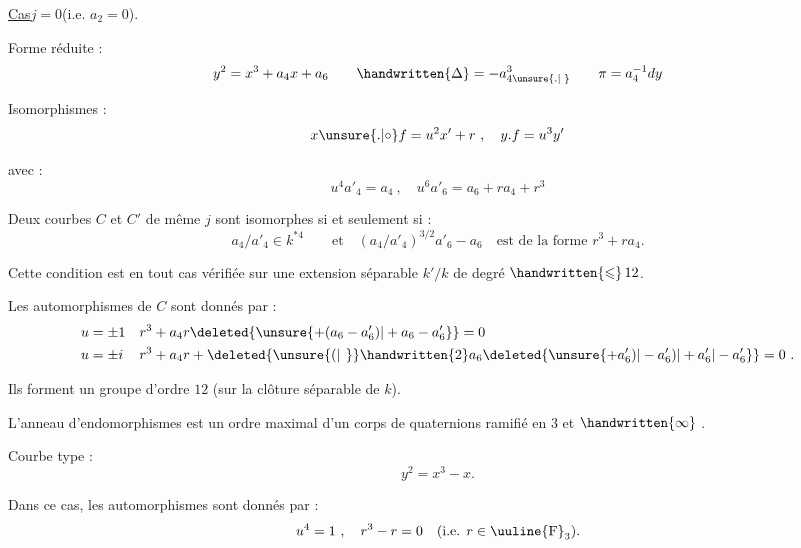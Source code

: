 
\uline{Cas}\quad $j=0$\quad (i.e. $a_{2}=0$).

Forme réduite :
\[
 y^{2}=x^{3}+a_{4}x+a_{6}\qquad \handwritten{\Delta}=-a_{4\unsure{.|\phantom{.}}}^{3}
 \qquad \pi=a_{4}^{-1}dy
\]

Isomorphismes :
\[
 x\unsure{\mathord{.}|\circ}f=u^{2}x'+r\ ,\quad
 y\mathord{.}f=u^{3}y'
\]

avec :
\[
 u^{4}a'_{4}=a_{4}\ ,\quad u^{6}a'_{6}=a_{6}+ra_{4}+r^{3}
\]

Deux courbes $C$ et $C'$ de même $j$ sont isomorphes si et seulement si :
\[
 a_{4}/a'_{4}\in k^{\ast 4}\qquad\text{et}\quad
 (a_{4}/a'_{4})^{3/2}a'_{6}-a_{6}\quad\text{est de la forme }r^{3}+ra_{4}.
\]

Cette condition est en tout cas vérifiée sur une extension séparable $k'/k$ de degré $\handwritten{\leqslant}\,12$.

Les automorphismes de $C$ sont donnés par :
\[
\begin{aligned}
u&=\pm 1 & r^{3}+a_{4}r&\deleted{\unsure{+(a_{6}-a'_{6})|+a_{6}-a'_{6}}}=0\\
u&=\pm i & r^{3}+a_{4}r&+\deleted{\unsure{(|\phantom{(}}}\handwritten{2}a_{6}\deleted{\unsure{+a'_{6})|-a'_{6})|+a'_{6}|-a'_{6}}}=0\ .
\end{aligned}
\]

Ils forment un groupe d'ordre $12$ (sur la clôture séparable de $k$).

L'anneau d'endomorphismes est un ordre maximal d'un corps de quaternions ramifié en $3$ et $\handwritten{\infty}$ .

Courbe type :
\[
 y^{2}=x^{3}-x.
\]

Dans ce cas, les automorphismes sont donnés par :
\[
 u^{4}=1\ ,\quad r^{3}-r=0\quad\text{(i.e. }r\in\text{\uuline{F}}_{3}\text{)}.
\]

